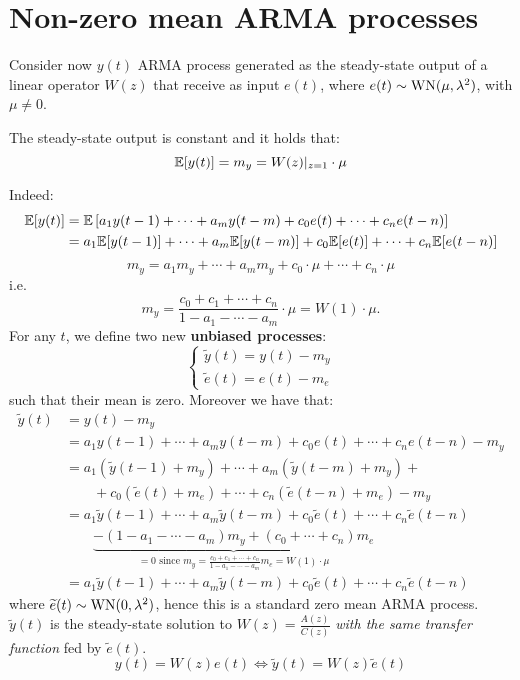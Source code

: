 \section{Non-zero mean ARMA processes}\label{sec:non-zero-mean-arma}
Consider now $y(t)$ ARMA process generated as the steady-state output of a linear operator $W(z)$ that receive as input $e(t)$, where $e(t) \sim \operatorname{WN}(\mu, \lambda^{2})$, with $\mu\neq0$.

\begin{theorem}\label{thm:gain-theorem}
	The steady-state output is constant and it holds that:
	\[
		\mathbb{E}[y(t)]=m_{y}=W(z)|_{z=1} \cdot \mu
	\]
\end{theorem}

Indeed:
\begin{align*}
		\mathbb{E}[y(t)] &=\mathbb{E}\left[a_{1} y(t-1)+\cdots+a_{m} y(t-m)+c_{0} e(t)+\cdots+c_{n} e(t-n)\right] \\
		&=a_{1} \mathbb{E}[y(t-1)]+\cdots+a_{m} \mathbb{E}[y(t-m)]+c_{0} \mathbb{E}[e(t)]+\cdots+c_{n} \mathbb{E}[e(t-n)]
\end{align*}
$$
m_{y}=a_{1} m_{y}+\cdots+a_{m} m_{y}+c_{0} \cdot \mu+\cdots+c_{n} \cdot \mu
$$
i.e.
\[
	m_{y}=\frac{c_{0}+c_{1}+\cdots+c_{n}}{1-a_{1}-\cdots-a_{m}} \cdot \mu=W(1) \cdot \mu.
\]
For any $t$, we define two new \textbf{unbiased processes}:
$$
\boxed{
	\begin{cases}
		\tilde{y}(t)=y(t)-m_{y}\\
		\tilde{e}(t)=e(t)-m_{e}
	\end{cases}
}
$$
such that their mean is zero. Moreover we have that:
\begin{align*}
	\tilde{y}(t)&= y(t)-m_{y}\\
	&= a_{1} y(t-1)+\cdots+a_{m} y(t-m)+c_{0} e(t)+\cdots+c_{n} e(t-n)-m_{y} \\
	&= a_{1}\left(\tilde{y}(t-1)+m_{y}\right)+\cdots+a_{m }\left(\tilde{y}(t-m)+m_{y}\right)+\\
	&\qquad +c_{0}\left(\tilde{e}(t)+m_{e}\right)+\cdots+c_{n}\left(\tilde{e}(t-n)+m_{e}\right)-m_{y} \\
	&= a_{1} \tilde{y}(t-1)+\cdots+a_{m} \tilde{y}(t-m)+c_{0} \tilde{e}(t)+\cdots+c_{n} \tilde{e}(t-n) \\
	&\qquad \underbrace{-\left(1-a_{1}-\cdots-a_{m}\right) m_{y}+\left(c_{0}+\cdots + c_{n}\right) m_{e}}_{=0\text { since } m_{y}=\frac{c_{0}+c_{1}+\cdots+c_{n}}{1-a_{1}-\cdots-a_{m }} m_{e}=W(1) \cdot \mu} \\
	&=a_{1} \tilde{y}(t-1)+\cdots+a_{m} \tilde{y}(t-m)+c_{0} \tilde{e}(t)+\cdots+c_{n} \tilde{e}(t-n)
\end{align*}
where $\widetilde{e}(t)\sim \operatorname{WN}(0, \lambda^{2})$, hence this is a standard zero mean ARMA process. $\tilde{y}(t)$ is the steady-state solution to $W(z)=\frac{A(z)}{C(z)}$ \emph{with the same transfer function} fed by $\tilde{e}(t)$.
\[
	\boxed{y(t)=W(z)e(t) \iff \tilde{y}(t)=W(z)\tilde{e}(t)}
\]

